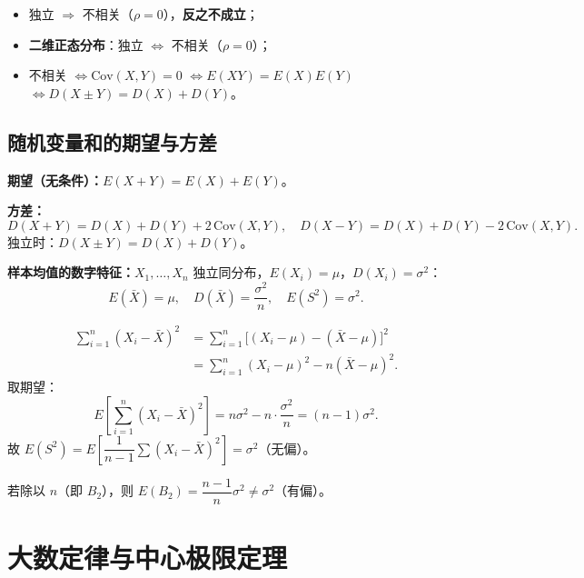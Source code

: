 \documentclass[11pt,a4paper]{article}
\begin{document}
\begin{keypoint}[独立与不相关的等价条件]
\begin{itemize}[leftmargin=2em]
  \item 独立 $\Rightarrow$ 不相关（$\rho=0$），\textbf{反之不成立}；
  \item \textbf{二维正态分布}：独立 $\iff$ 不相关（$\rho=0$）；
  \item 不相关 $\iff \mathrm{Cov}(X,Y)=0$ $\iff E(XY)=E(X)E(Y)$ $\iff D(X\pm Y)=D(X)+D(Y)$。
\end{itemize}
\end{keypoint}

\subsection{随机变量和的期望与方差}

\begin{variation}[和的数字特征]
\textbf{期望（无条件）：}$E(X+Y)=E(X)+E(Y)$。

\textbf{方差：}
\[
D(X+Y)=D(X)+D(Y)+2\,\mathrm{Cov}(X,Y), \quad D(X-Y)=D(X)+D(Y)-2\,\mathrm{Cov}(X,Y).
\]
独立时：$D(X\pm Y)=D(X)+D(Y)$。

\textbf{样本均值的数字特征：}$X_1,\dots,X_n$ 独立同分布，$E(X_i)=\mu$，$D(X_i)=\sigma^2$：
\[
E(\bar X)=\mu, \quad D(\bar X)=\frac{\sigma^2}{n}, \quad E(S^2)=\sigma^2.
\]
\end{variation}

\begin{derivation}[$E(S^2)=\sigma^2$ 的证明（无偏性）]
\begin{align*}
\sum_{i=1}^n (X_i-\bar X)^2 &= \sum_{i=1}^n \bigl[(X_i-\mu)-(\bar X-\mu)\bigr]^2 \\
&= \sum_{i=1}^n (X_i-\mu)^2 - n(\bar X-\mu)^2.
\end{align*}
取期望：
\[
E\!\left[\sum_{i=1}^n (X_i-\bar X)^2\right] = n\sigma^2 - n\cdot\frac{\sigma^2}{n} = (n-1)\sigma^2.
\]
故 $E(S^2)=E\!\left[\dfrac{1}{n-1}\sum(X_i-\bar X)^2\right]=\sigma^2$（无偏）。

若除以 $n$（即 $B_2$），则 $E(B_2)=\dfrac{n-1}{n}\sigma^2\neq\sigma^2$（有偏）。
\end{derivation}

\section{大数定律与中心极限定理}
\end{document}
